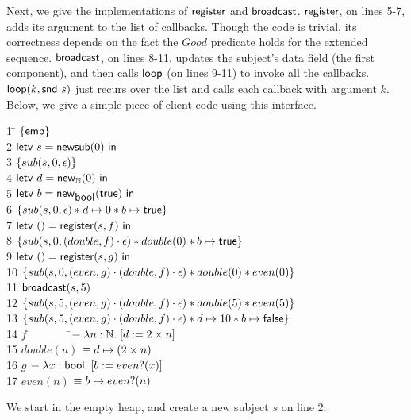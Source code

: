 \documentclass[preprint,natbib]{sigplanconf}
\begin{document}
Next, we give the implementations of $\mbox{\textsf{{register}}}$ and
$\mbox{\textsf{{broadcast}}}$. $\mbox{\textsf{{register}}}$, on lines 5-7, adds its
argument to the list of callbacks. Though the code is trivial, its
correctness depends on the fact the $Good$ predicate holds for the
extended sequence.  $\mbox{\textsf{{broadcast}}}$, on lines 8-11, updates the
subject's data field (the first component), and then calls
$\mbox{\textsf{{loop}}}$ (on lines 9-11) to invoke all the
callbacks. $\mbox{\textsf{{loop}}}(k, \mbox{\textsf{{snd }}} s)$ just recurs over the list and
calls each callback with argument $k$.  Below, we give a simple piece
of client code using this interface.
{\small
\begin{tabbing}
1 \qquad \= 
$\{{\mathsf{emp}}\}$ \\
2 \> 
$\mbox{\textsf{{letv }}}s = \mbox{\textsf{{newsub}}}(0)\mbox{\textsf{{ in }}}$ \\
3 \> $\{{sub(s, 0, \epsilon)}\}$ \\
4 \> $\mbox{\textsf{{letv }}}d = \mbox{\textsf{{new}}}_{\mathbb{N}} (0)\mbox{\textsf{{ in }}}$ \\
5 \> $\mbox{\textsf{{letv }}}b = \mbox{\textsf{{new}}}_{\mbox{\textsf{{bool}}}} (\mbox{\textsf{{true}}})\mbox{\textsf{{ in }}}$ \\
6 \> $\{{sub(s, 0, \epsilon) * d \mapsto 0 * b \mapsto \mbox{\textsf{{true}}}}\}$\\
7 \> $\mbox{\textsf{{letv }}}() = \mbox{\textsf{{register}}}(s, f)\mbox{\textsf{{ in }}}$\\
8 \> $\{{sub(s, 0, (double, f)\cdot\epsilon) * double(0) * b \mapsto \mbox{\textsf{{true}}}}\}$ \\
9 \> $\mbox{\textsf{{letv }}}() = \mbox{\textsf{{register}}}(s, g)\mbox{\textsf{{ in }}}$\\
10 \> $\{{sub(s, 0, (even, g)\cdot(double, f)\cdot\epsilon) * double(0) * even(0)}\}$ \\
11 \> $\mbox{\textsf{{broadcast}}}(s, 5)$ \\
12 \> $\{{sub(s, 5, (even, g)\cdot(double, f)\cdot\epsilon) * double(5) * even(5)}\}$ \\
13 \> $\{{sub(s, 5, (even, g)\cdot(double, f)\cdot\epsilon) * d \mapsto 10 * b \mapsto \mbox{\textsf{{false}}}}\}$ 
\\[0.5em]
14 \> $f \qquad \qquad $\=$\equiv \lambda n:\mathbb{N}.\; [d := 2 \times n]$ \\
15 \> $double(n)$ \> $\equiv d \mapsto (2 \times n)$ \\
16 \> $g$ \> $\equiv \lambda x:\mbox{\textsf{{bool}}}.\; [b := even?(x)]$ \\
17 \> $even(n)$ \> $\equiv b \mapsto even?(n)$ \\
\end{tabbing}
}
We start in the empty heap, and create a new subject $s$ on line 2.
\end{document}
